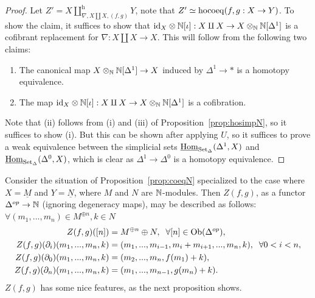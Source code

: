 \begin{proof}
Let $Z'=X \coprod^{\text{h}}_{\nabla,X \amalg X, (f,g)} Y$, note that $Z' \simeq \operatorname{hocoeq}(f,g:X \rightarrow Y)$. To show the claim, 
it suffices to show that $\text{id}_X \otimes \mathbb{N}[\iota]: X\amalg X \rightarrow X \otimes_{\mathbb{N}} \mathbb{N}[\Delta^1] $ is a cofibrant replacement for $\nabla: X \amalg X \to X$. This will follow from the following two claims:
\begin{enumerate}
\item[(i)] The canonical map $X \otimes_{\mathbb{N}} \mathbb{N}[\Delta^1] \rightarrow X$ induced by $\Delta^1 \to *$ is a homotopy equivalence.
\item[(ii)] The map $\text{id}_X \otimes \mathbb{N}[\iota]: X\amalg X \rightarrow X \otimes_{\mathbb{N}} \mathbb{N}[\Delta^1]$ is a cofibration.
\end{enumerate}
Note that (ii) follows from (i) and (iii) of Proposition~\ref{prop:hosimpN}, so it suffices to show (i). 
But this can be shown after applying $U$, so it suffices to prove a weak equivalence between the simplicial sets 
$\underline{\operatorname{Hom}}_{\text{Set}_{\Delta}}(\Delta^1, X)$ and $\underline{\operatorname{Hom}}_{\text{Set}_{\Delta}}(\Delta^0, X)$, which is clear as $\Delta^1 \to \Delta^0$ is a homotopy equivalence.
\end{proof}
\begin{example}\label{exmp:coeqN}
Consider the situation of Proposition~\ref{prop:coeqN} specialized to the case where $X=\underline{M}$ and $Y=\underline{N}$, where $M$ and $N$ are $\mathbb{N}$-modules. 
Then $Z(f,g)$, as a functor $\Delta^{op} \rightarrow \mathbb{N}$ (ignoring degeneracy maps), may be described as follows: $\forall (m_1,...,m_n) \in M^{\oplus n}, k \in N$
\begin{align*}
Z(f,g)([n]) &= M^{\oplus n} \oplus N, \; \; \forall [n] \in \operatorname{Ob}(\Delta^{op}),\\
Z(f,g)(\partial_i)(m_1,...,m_n,k) &= (m_1,...,m_{i-1}, m_i + m_{i+1},...,m_n, k), \; \;  \forall 0 < i < n,\\
Z(f,g)(\partial_0) (m_1,...,m_n,k) &= (m_2,...,m_n, f(m_1)+k),\\
Z(f,g)(\partial_n) (m_1,...,m_n,k) &= (m_1,...,m_{n-1}, g(m_n)+k).
\end{align*}
$Z(f,g)$ has some nice features, as the next proposition shows.
\end{example}
